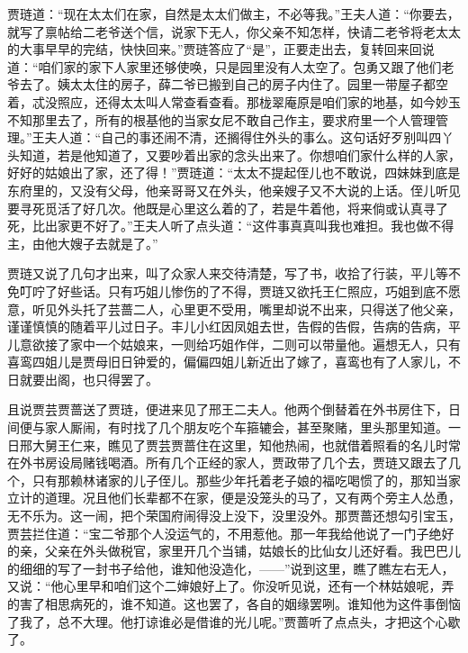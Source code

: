 \begin{parag}
贾琏道：“现在太太们在家，自然是太太们做主，不必等我。”王夫人道：“你要去，就写了禀帖给二老爷送个信，说家下无人，你父亲不知怎样，快请二老爷将老太太的大事早早的完结，快快回来。”贾琏答应了“是”，正要走出去，复转回来回说道：“咱们家的家下人家里还够使唤，只是园里没有人太空了。包勇又跟了他们老爷去了。姨太太住的房子，薛二爷已搬到自己的房子内住了。园里一带屋子都空着，忒没照应，还得太太叫人常查看查看。那栊翠庵原是咱们家的地基，如今妙玉不知那里去了，所有的根基他的当家女尼不敢自己作主，要求府里一个人管理管理。”王夫人道：“自己的事还闹不清，还搁得住外头的事么。这句话好歹别叫四丫头知道，若是他知道了，又要吵着出家的念头出来了。你想咱们家什么样的人家，好好的姑娘出了家，还了得！”贾琏道：“太太不提起侄儿也不敢说，四妹妹到底是东府里的，又没有父母，他亲哥哥又在外头，他亲嫂子又不大说的上话。侄儿听见要寻死觅活了好几次。他既是心里这么着的了，若是牛着他，将来倘或认真寻了死，比出家更不好了。”王夫人听了点头道：“这件事真真叫我也难担。我也做不得主，由他大嫂子去就是了。”
\end{parag}


\begin{parag}
    贾琏又说了几句才出来，叫了众家人来交待清楚，写了书，收拾了行装，平儿等不免叮咛了好些话。只有巧姐儿惨伤的了不得，贾琏又欲托王仁照应，巧姐到底不愿意，听见外头托了芸蔷二人，心里更不受用，嘴里却说不出来，只得送了他父亲，谨谨慎慎的随着平儿过日子。丰儿小红因凤姐去世，告假的告假，告病的告病，平儿意欲接了家中一个姑娘来，一则给巧姐作伴，二则可以带量他。遍想无人，只有喜鸾四姐儿是贾母旧日钟爱的，偏偏四姐儿新近出了嫁了，喜鸾也有了人家儿，不日就要出阁，也只得罢了。
\end{parag}


\begin{parag}
    且说贾芸贾蔷送了贾琏，便进来见了邢王二夫人。他两个倒替着在外书房住下，日间便与家人厮闹，有时找了几个朋友吃个车箍辘会，甚至聚赌，里头那里知道。一日邢大舅王仁来，瞧见了贾芸贾蔷住在这里，知他热闹，也就借着照看的名儿时常在外书房设局赌钱喝酒。所有几个正经的家人，贾政带了几个去，贾琏又跟去了几个，只有那赖林诸家的儿子侄儿。那些少年托着老子娘的福吃喝惯了的，那知当家立计的道理。况且他们长辈都不在家，便是没笼头的马了，又有两个旁主人怂恿，无不乐为。这一闹，把个荣国府闹得没上没下，没里没外。那贾蔷还想勾引宝玉，贾芸拦住道：“宝二爷那个人没运气的，不用惹他。那一年我给他说了一门子绝好的亲，父亲在外头做税官，家里开几个当铺，姑娘长的比仙女儿还好看。我巴巴儿的细细的写了一封书子给他，谁知他没造化，——”说到这里，瞧了瞧左右无人，又说：“他心里早和咱们这个二婶娘好上了。你没听见说，还有一个林姑娘呢，弄的害了相思病死的，谁不知道。这也罢了，各自的姻缘罢咧。谁知他为这件事倒恼了我了，总不大理。他打谅谁必是借谁的光儿呢。”贾蔷听了点点头，才把这个心歇了。
\end{parag}


